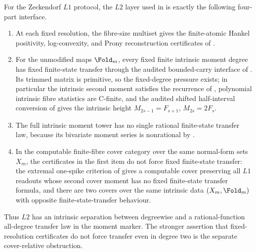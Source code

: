 \begin{theorem}
\label{thm:L2-consolidated-interface}
For the Zeckendorf \(L1\) protocol, the \(L2\) layer used in
 is exactly the following four-part interface.
\begin{enumerate}
\item At each fixed resolution, the fibre-size multiset gives the finite-atomic
  Hankel positivity, log-convexity, and Prony reconstruction certificates of
  .
\item For the unmodified maps \(\Fold_m\), every fixed finite intrinsic moment
  degree has fixed finite-state transfer through the audited bounded-carry
  interface of .  Its trimmed
  matrix is primitive, so the fixed-degree pressure exists; in particular the intrinsic second
  moment satisfies the recurrence of ,
  polynomial intrinsic fibre statistics are C-finite, and the audited shifted
  half-interval conversion of  gives the intrinsic height
  \(M_{2s-1}=F_{s+1}\), \(M_{2s}=2F_s\).
\item The full intrinsic moment tower has no single rational finite-state
  transfer law, because its bivariate moment series is nonrational by
  .
\item In the computable finite-fibre cover category over the same normal-form
  sets \(X_m\), the certificates in the first item do not force fixed finite-state
  transfer: the extremal one-spike criterion of
   gives a computable cover
  preserving all \(L1\) readouts whose second cover moment has no fixed
  finite-state transfer formula, and there are two covers over the same intrinsic
  data \((X_m,\Fold_m)\) with opposite finite-state-transfer behaviour.
\end{enumerate}
Thus \(L2\) has an intrinsic separation between degreewise and a
rational-function all-degree transfer law in the moment marker.  The stronger
assertion that fixed-resolution certificates do not force transfer even in
degree two is the separate cover-relative obstruction.
\end{theorem}

